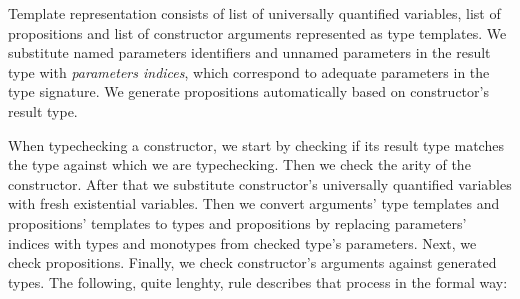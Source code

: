 \documentclass[declaration,shortabstract,english]{iithesis}
\begin{document}
Template representation consists of list of universally quantified variables, list of propositions and list of constructor
arguments represented as type templates. We substitute named parameters identifiers and unnamed parameters in the result type with
\textit{parameters indices}, which correspond to adequate parameters in the type signature.
We generate propositions automatically based on constructor's result type.

When typechecking a constructor, we start by checking if its result type matches the type against which we are typechecking.
Then we check the arity of the constructor.
After that we substitute constructor's universally quantified variables with fresh existential variables.
Then we convert arguments' type templates and propositions' templates to types and propositions
by replacing parameters' indices with types and monotypes from checked type's parameters.
Next, we check propositions. Finally, we check constructor's arguments against generated types.
The following, quite lenghty, rule describes that process in the formal way:
\end{document}
